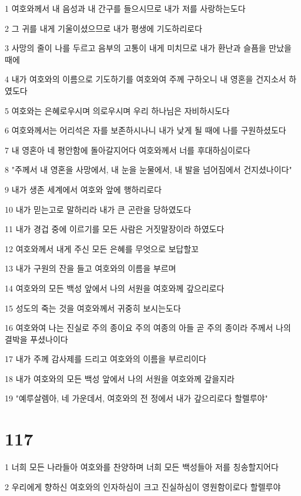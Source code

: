 \par 1 여호와께서 내 음성과 내 간구를 들으시므로 내가 저를 사랑하는도다
\par 2 그 귀를 내게 기울이셨으므로 내가 평생에 기도하리로다
\par 3 사망의 줄이 나를 두르고 음부의 고통이 내게 미치므로 내가 환난과 슬픔을 만났을 때에
\par 4 내가 여호와의 이름으로 기도하기를 여호와여 주께 구하오니 내 영혼을 건지소서 하였도다
\par 5 여호와는 은혜로우시며 의로우시며 우리 하나님은 자비하시도다
\par 6 여호와께서는 어리석은 자를 보존하시나니 내가 낮게 될 때에 나를 구원하셨도다
\par 7 내 영혼아 네 평안함에 돌아갈지어다 여호와께서 너를 후대하심이로다
\par 8 "주께서 내 영혼을 사망에서, 내 눈을 눈물에서, 내 발을 넘어짐에서 건지셨나이다"
\par 9 내가 생존 세계에서 여호와 앞에 행하리로다
\par 10 내가 믿는고로 말하리라 내가 큰 곤란을 당하였도다
\par 11 내가 경겁 중에 이르기를 모든 사람은 거짓말장이라 하였도다
\par 12 여호와께서 내게 주신 모든 은혜를 무엇으로 보답할꼬
\par 13 내가 구원의 잔을 들고 여호와의 이름을 부르며
\par 14 여호와의 모든 백성 앞에서 나의 서원을 여호와께 갚으리로다
\par 15 성도의 죽는 것을 여호와께서 귀중히 보시는도다
\par 16 여호와여 나는 진실로 주의 종이요 주의 여종의 아들 곧 주의 종이라 주께서 나의 결박을 푸셨나이다
\par 17 내가 주께 감사제를 드리고 여호와의 이름을 부르리이다
\par 18 내가 여호와의 모든 백성 앞에서 나의 서원을 여호와께 갚을지라
\par 19 "예루살렘아, 네 가운데서, 여호와의 전 정에서 내가 갚으리로다 할렐루야"

\chapter{117}

\par 1 너희 모든 나라들아 여호와를 찬양하며 너희 모든 백성들아 저를 칭송할지어다
\par 2 우리에게 향하신 여호와의 인자하심이 크고 진실하심이 영원함이로다 할렐루야

